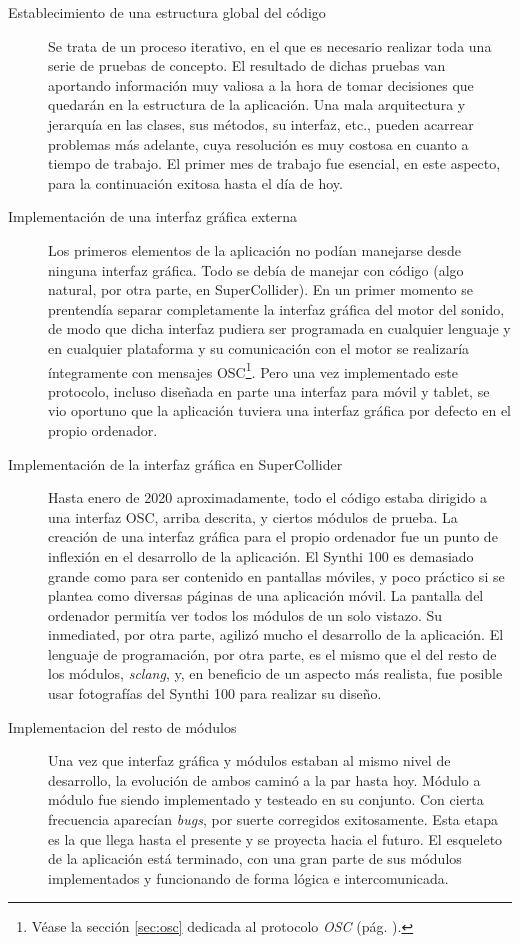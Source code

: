 \begin{description} 
	\item[Establecimiento de una estructura global del código] Se trata de un proceso iterativo, en el que es necesario realizar toda una serie de pruebas de concepto. El resultado de dichas pruebas van aportando información muy valiosa a la hora de tomar decisiones que quedarán en la estructura de la aplicación. Una mala arquitectura y jerarquía en las clases, sus métodos, su interfaz, etc., pueden acarrear problemas más adelante, cuya resolución es muy costosa en cuanto a tiempo de trabajo. El primer mes de trabajo fue esencial, en este aspecto, para la continuación exitosa hasta el día de hoy.
	
	\item[Implementación de una interfaz gráfica externa] Los primeros elementos de la aplicación no podían manejarse desde ninguna interfaz gráfica. Todo se debía de manejar con código (algo natural, por otra parte, en SuperCollider). En un primer momento se prentendía separar completamente la interfaz gráfica del motor del sonido, de modo que dicha interfaz pudiera ser programada en cualquier lenguaje y en cualquier plataforma y su comunicación con el motor se realizaría íntegramente con mensajes OSC\footnote{Véase la sección \ref{sec:osc} dedicada al protocolo \textit{OSC} (pág. \pageref{sec:osc}).}. Pero una vez implementado este protocolo, incluso diseñada en parte una interfaz para móvil y tablet, se vio oportuno que la aplicación tuviera una interfaz gráfica  por defecto en el propio ordenador.
	
	\item[Implementación de la interfaz gráfica en SuperCollider] Hasta enero de 2020 aproximadamente, todo el código estaba dirigido a una interfaz OSC, arriba descrita, y ciertos módulos de prueba. La creación de una interfaz gráfica para el propio ordenador fue un punto de inflexión en el desarrollo de la aplicación. El Synthi 100 es demasiado grande como para ser contenido en pantallas móviles, y poco práctico si se plantea como diversas páginas de una aplicación móvil. La pantalla del ordenador permitía ver todos los módulos de un solo vistazo. Su inmediated, por otra parte, agilizó mucho el desarrollo de la aplicación. El lenguaje de programación, por otra parte, es el mismo que el del resto de los módulos, \textit{sclang}, y, en beneficio de un aspecto más realista, fue posible usar fotografías del Synthi 100 para realizar su diseño.
	
	\item[Implementacion del resto de módulos] Una vez que interfaz gráfica y módulos estaban al mismo nivel de desarrollo, la evolución de ambos caminó a la par hasta hoy. Módulo a módulo fue siendo implementado y testeado en su conjunto. Con cierta frecuencia aparecían \textit{bugs}, por suerte corregidos exitosamente. Esta etapa es la que llega hasta el presente y se proyecta hacia el futuro. El esqueleto de la aplicación está terminado, con una gran parte de sus módulos implementados y funcionando de forma lógica e intercomunicada.
\end{description}




